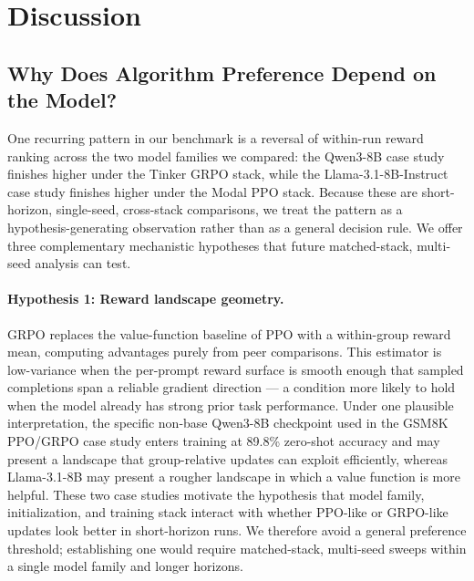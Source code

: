 \documentclass{article}
\begin{document}
\section{Discussion}
\label{sec:discussion}

\subsection{Why Does Algorithm Preference Depend on the Model?}
\label{sec:discuss_model_algo}

One recurring pattern in our benchmark is a reversal of within-run reward
ranking across the two model families we compared: the Qwen3-8B case study
finishes higher under the Tinker GRPO stack, while the Llama-3.1-8B-Instruct
case study finishes higher under the Modal PPO stack. Because these are
short-horizon, single-seed, cross-stack comparisons, we treat the pattern as a
hypothesis-generating observation rather than as a general decision rule. We
offer three complementary mechanistic hypotheses that future matched-stack,
multi-seed analysis can test.

\paragraph{Hypothesis 1: Reward landscape geometry.}
GRPO replaces the value-function baseline of PPO with a within-group reward
mean, computing advantages purely from peer comparisons.
This estimator is low-variance when the per-prompt reward surface is smooth
enough that sampled completions span a reliable gradient direction --- a
condition more likely to hold when the model already has strong prior task
performance.
Under one plausible interpretation, the specific non-base Qwen3-8B checkpoint
used in the GSM8K PPO/GRPO case study enters training at 89.8\% zero-shot
accuracy and may present a landscape that group-relative updates can exploit
efficiently, whereas Llama-3.1-8B may present a rougher landscape in which a
value function is more helpful.
These two case studies motivate the hypothesis that model family,
initialization, and training stack interact with whether PPO-like or GRPO-like
updates look better in short-horizon runs. We therefore avoid a general
preference threshold; establishing one would require matched-stack, multi-seed
sweeps within a single model family and longer horizons.
\end{document}
